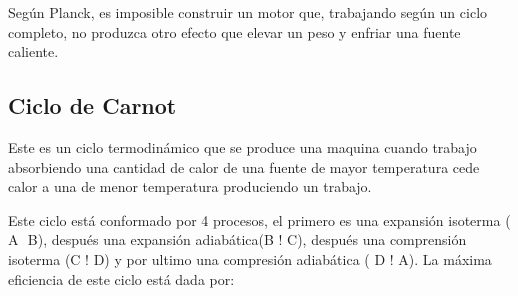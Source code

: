 Según Planck, es imposible construir un motor que, trabajando según un ciclo completo, no produzca otro efecto que elevar un peso y enfriar una fuente caliente.

\subsection{Ciclo de Carnot}
Este es un ciclo termodinámico que se produce una maquina cuando trabajo absorbiendo una cantidad de calor de una fuente de mayor temperatura cede calor a una de menor temperatura produciendo un trabajo. 

Este ciclo está conformado por 4 procesos, el primero es una expansión isoterma ( A $$ B), después una expansión adiabática(B ! C), después una comprensión isoterma (C ! D) y por ultimo una compresión adiabática ( D ! A). La máxima eﬁciencia de este ciclo está dada por: